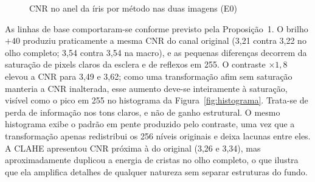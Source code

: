 \documentclass[12pt, oneside, a4paper, chapter=TITLE, section=TITLE,
               english, brazil]{abntex2}
\begin{document}
\begin{table}[htbp]
  \caption{Visibilidade das estruturas no anel da íris (E0)}
  \label{tab:vasc-principal}
  \centering\footnotesize
  
\end{table}

\begin{figure}[htbp]
  \caption{CNR no anel da íris por método nas duas imagens (E0)}
  \label{fig:barras-cnr}
  \centering
\end{figure}

As linhas de base comportaram-se conforme previsto pela Proposição~1. O
brilho $+40$ produziu praticamente a mesma CNR do canal original (3,21 contra
3,22 no olho completo; 3,54 contra 3,54 na macro), e as pequenas diferenças
decorrem da saturação de pixels claros da esclera e de reflexos em 255. O
contraste $\times 1{,}8$ elevou a CNR para 3,49 e 3,62; como uma
transformação afim sem saturação manteria a CNR inalterada, esse aumento
deve-se inteiramente à saturação, visível como o pico em 255 no histograma
da Figura~\ref{fig:histograma}. Trata-se de perda de informação nos tons
claros, e não de ganho estrutural. O mesmo histograma exibe o padrão em pente
produzido pelo contraste, uma vez que a transformação apenas redistribui os
256 níveis originais e deixa lacunas entre eles. A CLAHE apresentou CNR
próxima à do original (3,26 e 3,34), mas aproximadamente duplicou a energia
de cristas no olho completo, o que ilustra que ela amplifica detalhes de
qualquer natureza sem separar estruturas do fundo.
\end{document}
